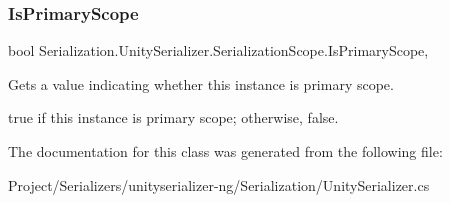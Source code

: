 \subsubsection{\texorpdfstring{Is\+Primary\+Scope}{IsPrimaryScope}}
{\footnotesize\ttfamily bool Serialization.\+Unity\+Serializer.\+Serialization\+Scope.\+Is\+Primary\+Scope\hspace{0.3cm}{\ttfamily [static]}, {\ttfamily [get]}}



Gets a value indicating whether this instance is primary scope. 

{\ttfamily true} if this instance is primary scope; otherwise, {\ttfamily false}.

The documentation for this class was generated from the following file\+:\begin{DoxyCompactItemize}
\item 
Project/\+Serializers/unityserializer-\/ng/\+Serialization/Unity\+Serializer.\+cs\end{DoxyCompactItemize}
